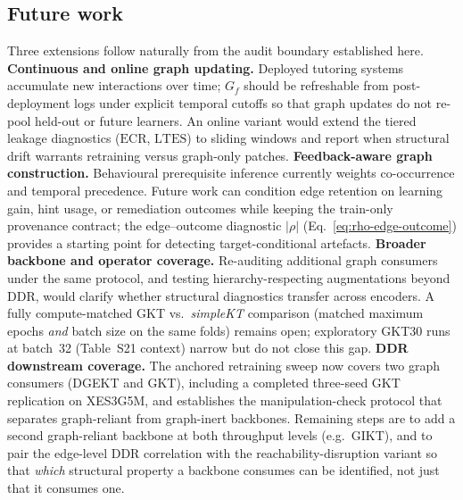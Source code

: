 \documentclass[preprint,10pt,doubleblind]{elsarticle}
\newcommand{\DDR}{\textsc{DDR}}
\begin{document}
\subsection{Future work}
\label{sec:future-work}
Three extensions follow naturally from the audit boundary established here.
\textbf{Continuous and online graph updating.} Deployed tutoring systems
accumulate new interactions over time; $G_f$ should be refreshable from
post-deployment logs under explicit temporal cutoffs so that graph updates
do not re-pool held-out or future learners. An online variant would extend
the tiered leakage diagnostics ($\mathrm{ECR}$, $\mathrm{LTES}$) to sliding windows
and report when structural drift warrants retraining versus graph-only
patches.
\textbf{Feedback-aware graph construction.} Behavioural prerequisite
inference currently weights co-occurrence and temporal precedence. Future
work can condition edge retention on learning gain, hint usage, or
remediation outcomes while keeping the train-only provenance contract;
the edge--outcome diagnostic $|\rho|$ (Eq.~\eqref{eq:rho-edge-outcome})
provides a starting point for detecting target-conditional artefacts.
\textbf{Broader backbone and operator coverage.} Re-auditing additional
graph consumers under the same protocol, and testing hierarchy-respecting
augmentations beyond \DDR{}, would clarify whether structural diagnostics
transfer across encoders. A fully compute-matched GKT vs.\ \textit{simpleKT}
comparison (matched maximum epochs \emph{and} batch size on the same folds)
remains open; exploratory GKT30 runs at batch~32 (Table~S21 context) narrow
but do not close this gap.
\textbf{\DDR{} downstream coverage.} The anchored retraining sweep now covers
two graph consumers (DGEKT and GKT), including a completed three-seed GKT
replication on XES3G5M, and establishes the manipulation-check protocol that
separates graph-reliant from graph-inert backbones. Remaining steps are to add a
second graph-reliant backbone at both throughput levels (e.g.\ GIKT), and to pair
the edge-level \DDR{} correlation with the reachability-disruption variant so that
\emph{which} structural property a backbone consumes can be identified, not just
that it consumes one.

\end{document}
